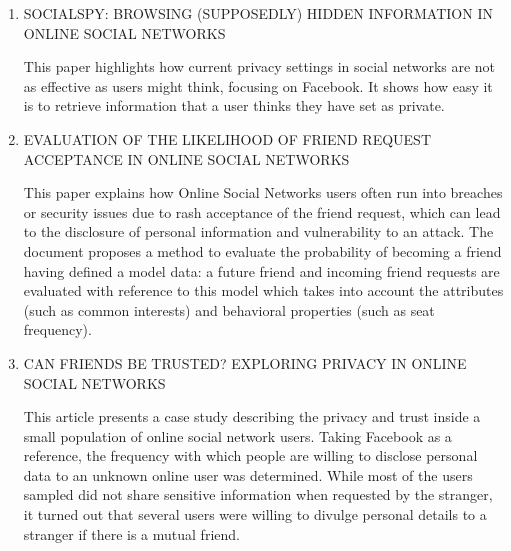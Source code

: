 \begin{enumerate}
	\item
	\textsc{SOCIALSPY: BROWSING (SUPPOSEDLY) HIDDEN INFORMATION IN ONLINE SOCIAL NETWORKS} \parencite{site:paper4}
	\par This paper highlights how current privacy settings in social networks are not as effective as users might think, focusing on Facebook. It shows how easy it is to retrieve information that a user thinks they have set as private.
	
	\item 
	\textsc{EVALUATION OF THE LIKELIHOOD OF FRIEND REQUEST ACCEPTANCE IN ONLINE SOCIAL NETWORKS} \parencite{site:paper5}
	\par This paper explains how Online Social Networks users often run into breaches or security issues due to rash acceptance of the friend request, which can lead to the disclosure of personal information and vulnerability to an attack. The document proposes a method to evaluate the probability of becoming a friend having defined a model data: a future friend and incoming friend requests are evaluated with reference to this model which takes into account the attributes (such as common interests) and behavioral properties (such as seat frequency).
	
	\item
	\textsc{CAN FRIENDS BE TRUSTED? EXPLORING PRIVACY IN ONLINE SOCIAL NETWORKS} \parencite{site:paper6}
	\par This article presents a case study describing the privacy and trust inside a small population of online social network users. Taking Facebook as a reference, the frequency with which people are willing to disclose personal data to an unknown online user was determined. While most of the users sampled did not share sensitive information when requested by the stranger, it turned out that several users were willing to divulge personal details to a stranger if there is a mutual friend.	
	

\end{enumerate}
